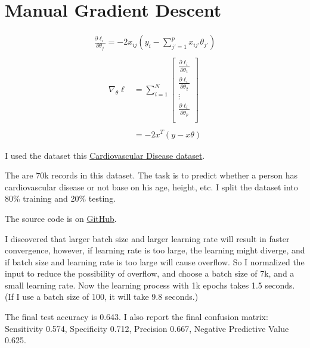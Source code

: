 \newcommand\chapternumber{3}

\usepackage{enumerate}
\usepackage{float}



\section{Manual Gradient Descent}
\begin{align*}
    \frac{\partial \ell_i}{\partial \theta_j} = -2 x_{ij} (y_i - \sum_{j'=1}^{p} x_{ij'} \theta_{j'})\\
\end{align*}
\begin{align*}
    \nabla_{\theta} \ell &= \sum_{i=1}^{N} \begin{bmatrix}
        \frac{\partial \ell_i}{\partial \theta_1} \\
        \frac{\partial \ell_i}{\partial \theta_2} \\
        \vdots \\
        \frac{\partial \ell_i}{\partial \theta_p} \\
    \end{bmatrix}\\\\
    &= -2 x^T (y-x\theta)
\end{align*}

I used the dataset this \href{https://www.kaggle.com/sulianova/cardiovascular-disease-dataset}{Cardiovascular Disease dataset}.

The are 70k records in this dataset.
The task is to predict whether a person has cardiovascular disease or not base on his age, height, etc.
I split the dataset into 80\% training and 20\% testing.

The source code is on \href{https://github.com/liusida/ds2/blob/main/assignment3/code/q1.py}{GitHub}.

I discovered that larger batch size and larger learning rate will result in faster convergence, 
however, if learning rate is too large, the learning might diverge,
and if batch size and learning rate is too large will cause overflow.
So I normalized the input to reduce the possibility of overflow, and choose a batch size of 7k, and a small learning rate.
Now the learning process with 1k epochs takes 1.5 seconds. (If I use a batch size of 100, it will take 9.8 seconds.)

The final test accuracy is 0.643.
I also report the final confusion matrix:
Sensitivity 0.574, Specificity 0.712,
Precision 0.667, Negative Predictive Value 0.625.

